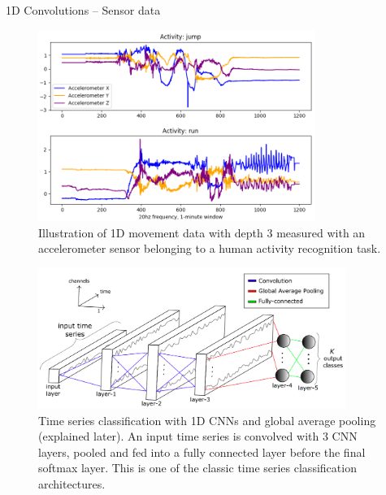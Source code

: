\begin{vbframe}{1D Convolutions -- Sensor data}
    \begin{figure}
        \centering
        \includegraphics[width=9cm]{plots/05_conv_variations/1d/HAR.png}
        \caption{Illustration of 1D movement data with depth $3$ measured with an accelerometer sensor belonging to a human activity recognition task. }
    \end{figure}
\framebreak
    \begin{figure}
        \centering
        \includegraphics[width=10cm]{plots/05_conv_variations/1d/deep_tsc.png}
        \caption{Time series classification with 1D CNNs and global average pooling (explained later). An input time series is convolved with 3 CNN layers, pooled and fed into a fully connected layer before the final softmax layer. This is one of the classic time series classification architectures.}
    \end{figure}
\end{vbframe}

